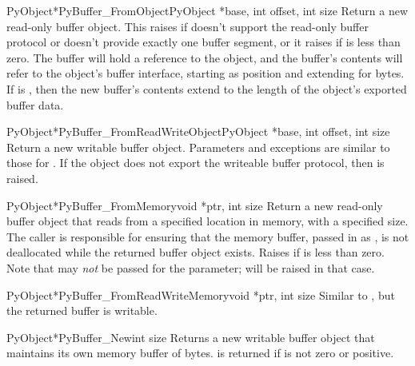 \documentclass{manual}
\begin{document}
\begin{cfuncdesc}{PyObject*}{PyBuffer_FromObject}{PyObject *base,
                                                  int offset, int size}
Return a new read-only buffer object.  This raises
 if  doesn't support the read-only
buffer protocol or doesn't provide exactly one buffer segment, or it
raises  if  is less than zero. The
buffer will hold a reference to the  object, and the
buffer's contents will refer to the  object's buffer
interface, starting as position  and extending for
 bytes. If  is , then
the new buffer's contents extend to the length of the
 object's exported buffer data.
\end{cfuncdesc}

\begin{cfuncdesc}{PyObject*}{PyBuffer_FromReadWriteObject}{PyObject *base,
                                                           int offset,
                                                           int size}
Return a new writable buffer object.  Parameters and exceptions are
similar to those for .
If the  object does not export the writeable buffer
protocol, then  is raised.
\end{cfuncdesc}

\begin{cfuncdesc}{PyObject*}{PyBuffer_FromMemory}{void *ptr, int size}
Return a new read-only buffer object that reads from a specified
location in memory, with a specified size.
The caller is responsible for ensuring that the memory buffer, passed
in as , is not deallocated while the returned buffer object
exists.  Raises  if  is less than
zero.  Note that  may \emph{not} be passed
for the  parameter;  will be raised in 
that case.
\end{cfuncdesc}

\begin{cfuncdesc}{PyObject*}{PyBuffer_FromReadWriteMemory}{void *ptr, int size}
Similar to , but the returned buffer
is writable.
\end{cfuncdesc}

\begin{cfuncdesc}{PyObject*}{PyBuffer_New}{int size}
Returns a new writable buffer object that maintains its own memory
buffer of  bytes.   is returned if
 is not zero or positive.
\end{cfuncdesc}
\end{document}
